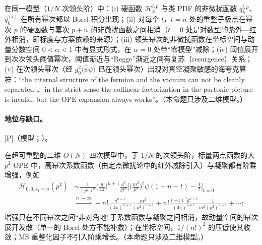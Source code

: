 \begin{proposition}\label{prop:yzliu-gn-structure}
在同一模型（$1/N$ 次领头阶）中：(i) 硬函数 $\mathcal H^{l,p}_k$ 与类 PDF 的非微扰函数 $q^{l,p}_k$、$\hat q^{(l)}_k$ 在所有幂次都以 Borel 积分出现；(ii) 对每个 $l$，$t=n$ 处的重整子极点在幂次 $p$ 的硬函数与幂次 $p+n$ 的非微扰函数之间相消（$t=0$ 处是对数型的紫外—红外相消，即标度与方案依赖的来源）；(iii) 领头幂次的非微扰函数在坐标空间与动量分数空间 $0<\alpha<1$ 中有显式形式，在 $\alpha=0$ 处带“零模型”减除；(iv) 阈值展开到次次领头阈值幂次，阈值渐近与“Regge”渐近之间有复苏（resurgence）关系；(v) 在次领头幂次（经 $g_0^2\langle\bar\psi\psi\rangle$ 已在领头幂次）出现对真空凝聚敏感的海夸克算符：“the internal structure of the fermion and the vacuum can not be cleanly separated \dots\ in the strict sense the collinear factorization in the partonic picture is invalid, but the OPE expansion always works”。（本命题只涉及二维模型。）
\end{proposition}

\paragraph{地位与缺口。}[P]（模型；\cite[第~1--2.1、4、7~节]{Liu:2024omb}）。

\begin{proposition}\label{prop:yzliu-on-factorial}
在超可重整的二维 $O(N)$ 四次模型中，于 $1/N$ 的次领头阶，标量两点函数的大 $p^2$ OPE 中，高幂次系数函数（由定点微扰论中的红外减除引入）与凝聚都有阶乘增强，例如 %
\begin{equation}\label{eq:yzliu-on-factorial}
\begin{aligned}
\mathcal H_{0,0,s_1=n}(p^2)&\sim\frac1{(p^2)^n}\Big(\frac g{4\pi}\Big)^{n+1}\frac{\dd^n}{\dd t^n}\Big[\Big(\frac{m^2}{p^2}\Big)^t\psi(1-n-t)-\frac1t\Big]_{t=0}\\
&\xrightarrow{n\to\infty}-n!\frac{g^{n+1}}{(4\pi)^{n+1}}\frac{m^2}{(p^2)^{n+1}}+n!\frac{(-1)^ng^{n+1}}{(4\pi)^{n+1}}\frac1{m^2(p^2)^{n-1}}+\cdots ;
\end{aligned}
\end{equation}
增强只在不同幂次之间“非对角地”于系数函数与凝聚之间相消，故动量空间的幂次展开发散（单一的 Borel 处方不能补救）；在坐标空间，$1/(n!)^2$ 的压低使其收敛；$\overline{\mathrm{MS}}$ 重整化因子不引入阶乘增长。（本命题只涉及二维模型。）
\end{proposition}

